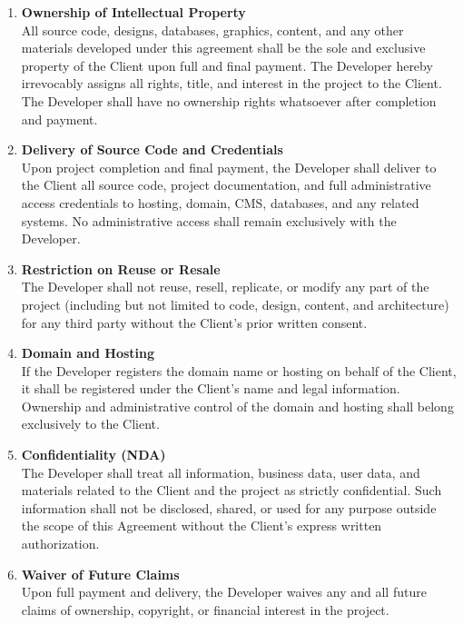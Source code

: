 \documentclass[11pt, a4paper]{article}
\begin{document}
\begin{enumerate}[label=\textbf{4.\arabic*}, leftmargin=*, wide, labelwidth=!, labelindent=0pt]
    \item \textbf{Ownership of Intellectual Property} \\
    All source code, designs, databases, graphics, content, and any other materials developed under this agreement shall be the sole and exclusive property of the Client upon full and final payment. The Developer hereby irrevocably assigns all rights, title, and interest in the project to the Client. The Developer shall have no ownership rights whatsoever after completion and payment.

    \item \textbf{Delivery of Source Code and Credentials} \\
    Upon project completion and final payment, the Developer shall deliver to the Client all source code, project documentation, and full administrative access credentials to hosting, domain, CMS, databases, and any related systems. No administrative access shall remain exclusively with the Developer.

    \item \textbf{Restriction on Reuse or Resale} \\
    The Developer shall not reuse, resell, replicate, or modify any part of the project (including but not limited to code, design, content, and architecture) for any third party without the Client’s prior written consent.

    \item \textbf{Domain and Hosting} \\
    If the Developer registers the domain name or hosting on behalf of the Client, it shall be registered under the Client’s name and legal information. Ownership and administrative control of the domain and hosting shall belong exclusively to the Client.

    \item \textbf{Confidentiality (NDA)} \\
    The Developer shall treat all information, business data, user data, and materials related to the Client and the project as strictly confidential. Such information shall not be disclosed, shared, or used for any purpose outside the scope of this Agreement without the Client’s express written authorization.

    \item \textbf{Waiver of Future Claims} \\
    Upon full payment and delivery, the Developer waives any and all future claims of ownership, copyright, or financial interest in the project.


\end{enumerate}
\end{document}
